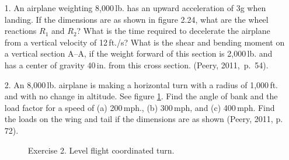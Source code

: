 \documentclass{AeroStructure-ERJohnson}
\begin{document}
\begin{enumerate}
\item[1.] An airplane weighting 8,000\,lb. has an upward acceleration of 3g when landing. If the dimensions are as shown in figure 2.24, what are the wheel reactions $R_{1}$ and $R_{2}$? What is the time required to decelerate the airplane from a vertical velocity of 12\,ft./s? What is the shear and bending moment on a vertical section A--A, if the weight forward of this section is 2,000\,lb. and has a center of gravity 40\,in. from this cross section. (Peery, 2011,~p.~54).

{\def\thefigure{2.24}
}


\item[2.] An 8,000\,lb. airplane is making a horizontal turn with a radius of 1,000\,ft. and with no change in altitude. See figure \ref{fig2.25}. Find the angle of bank and the load factor for a speed of (a) 200\,mph., (b) 300\,mph, and (c) 400\,mph. Find the loads on the wing and tail if the dimensions are as shown (Peery, 2011, p. 72).

\pagebreak

{\def\thefigure{2.25}
\begin{figure}
\caption{Exercise 2. Level flight coordinated turn.\label{fig2.25}}
\end{figure}
}



\vspace*{-12pt}


\end{enumerate}
\end{document}
